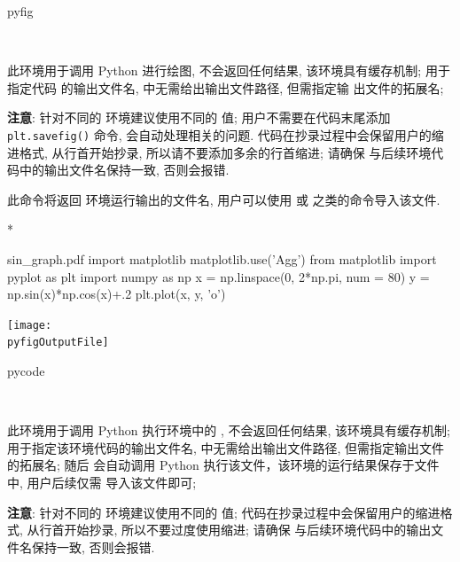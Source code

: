 \documentclass[
  hyper, lang=cn, 
  class=l3dox, 
]{../../zlatex/code/ztex}
\begin{document}
\begin{function}[updated=2025-05-21]{pyfig}
  \begin{syntax}
    ~~~~ 
  \end{syntax}
  此环境用于调用 Python 进行绘图, 不会返回任何结果, 该环境具有缓存机制;
   用于指定代码  的输出文件名,  中无需给出输出文件路径, 但需指定输
  出文件的拓展名;\par 
  \textbf{注意}: 针对不同的  环境建议使用不同的  值; 用户不需要在代码末尾添加 \verb|plt.savefig()| 命令,
  \ztikz{} 会自动处理相关的问题. 代码在抄录过程中会保留用户的缩进格式, 从行首开始抄录, 所以请不要添加多余的行首缩进;
  请确保  与后续环境代码中的输出文件名保持一致, 否则会报错.
\end{function}


\begin{function}[added=2025-04-21, EXP]{\pyfigOutputFile}
  此命令将返回  环境运行输出的文件名, 用户可以使用  
  或  之类的命令导入该文件.
\end{function}

\begin{DocExample}*
\begin{pyfig}{sin_graph.pdf}
import matplotlib
matplotlib.use('Agg')
from matplotlib import pyplot as plt
import numpy as np
x = np.linspace(0, 2*np.pi, num = 80)
y = np.sin(x)*np.cos(x)+.2
plt.plot(x, y, 'o')
\end{pyfig}
\begin{center}
  \texttt{[image: \\pyfigOutputFile]}
\end{center}
\end{DocExample}


\begin{function}[added=2025-05-21]{pycode}
  \begin{syntax}
  ~~~~ 
  \end{syntax}
  此环境用于调用 Python 执行环境中的 , 不会返回任何结果, 该环境具有缓存机制; 
   用于指定该环境代码的输出文件名,  中无需给出输出文件路径, 但需指定输出文件的拓展名; 
  随后 \ztikz{} 会自动调用 Python 执行该文件，该环境的运行结果保存于文件  中, 用户后续仅需
  导入该文件即可;\par 
  \textbf{注意}: 针对不同的  环境建议使用不同的  值; 代码在抄录过程中会保留用户的缩进格式, 
  从行首开始抄录, 所以不要过度使用缩进; 请确保  与后续环境代码中的输出文件名保持一致, 否则会报错.
\end{function}
\end{document}
